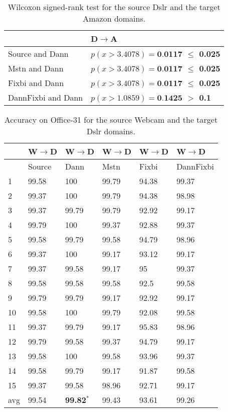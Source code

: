 \begin{table}[H]
\centering
\caption{Wilcoxon signed-rank test for the source Dslr and the target Amazon domains.}
\label{tab:DA_wil}
\begin{tabular}{|l|l|}
\hline
 & D$\rightarrow$A \\ \hline
Source and Dann & \textbf{$p(x > 3.4078) = \textbf{0.0117}$ $\leq$ 0.025} \\ \hline
Mstn and Dann & \textbf{$p(x > 3.4078) = \textbf{0.0117}$ $\leq$ 0.025} \\ \hline
Fixbi and Dann & \textbf{$p(x > 3.4078) = \textbf{0.0117}$ $\leq$ 0.025} \\\hline
DannFixbi and Dann & \textbf{$p(x > 1.0859)= \textbf{0.1425} $ $>$ 0.1} \\ \hline
\end{tabular}
\end{table} 


\begin{table}[H]
\centering
\caption{Accuracy on Office-31 for the source Webcam and the target Dslr domains.}
\label{tab:WD}
\begin{tabular}{|p{2cm}|p{2cm}|p{2cm}|p{2cm}|p{2cm}|p{2cm}|}
\hline
   & W$\rightarrow$D & W$\rightarrow$D & W$\rightarrow$D & W$\rightarrow$D & W$\rightarrow$D \\ \hline
 & Source & Dann & Mstn & Fixbi & DannFixbi \\ \hline
1 & 99.58 & 100 & 99.79 & 94.38 & 99.37 \\ \hline
2 & 99.37 & 100 & 99.79 & 94.38 & 98.98 \\ \hline
3 & 99.37 & 99.79 & 99.79 & 92.92 & 99.17 \\ \hline
4 & 99.79 & 100 & 99.37 & 92.88 & 99.37 \\ \hline
5 & 99.58 & 99.79 & 99.58 & 94.79 & 98.96 \\ \hline
6 & 99.37 & 100 & 99.17 & 93.12 & 99.17 \\ \hline
7 & 99.37 & 99.58 & 99.17 & 95 & 99.37 \\ \hline
8 & 99.58 & 99.58 & 99.58 & 92.5 & 99.58 \\ \hline
9 & 99.79 & 99.79 & 99.17 & 92.92 & 99.17 \\ \hline
10 & 99.58 & 100 & 99.79 & 92.08 & 99.58 \\ \hline
11 & 99.37 & 99.79 & 99.17 & 95.83 & 98.96 \\ \hline
12 & 99.79 & 99.58 & 99.37 & 94.79 & 99.17 \\ \hline
13 & 99.58 & 100 & 99.58 & 93.96 & 99.37 \\ \hline
14 & 99.58 & 99.79 & 99.17 & 91.87 & 99.58 \\ \hline
15 & 99.37 & 99.58 & 98.96 & 92.71 & 99.17 \\ \hline
avg & 99.54 & \textbf{99.82}$^*$ & 99.43 & 93.61 & 99.26 \\ \hline
\end{tabular}
\end{table}

